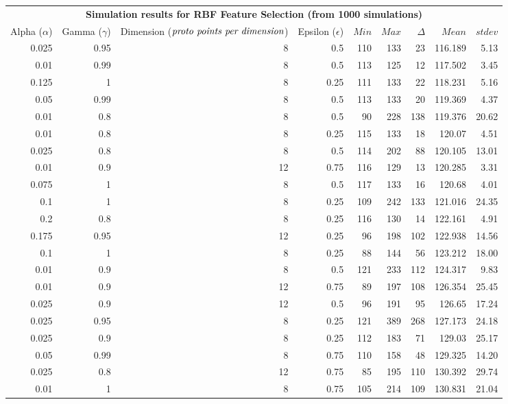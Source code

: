 \documentclass[10pt,twocolumn]{article}
\begin{document}
\begin{table}\centering
  \begin{tabular}{@{}rrrr|rrrrr@{}}\toprule
  \multicolumn{9}{c}{\textbf{Simulation results for RBF Feature Selection (from 1000 simulations)}}\\
  Alpha ($\alpha$) & Gamma ($\gamma$) & Dimension ($\emph{proto points per dimension}$) & Epsilon ($\epsilon$) & $Min$ & $Max$ & $\Delta$ & $Mean$ & $stdev$\\
  0.025 & 0.95 & 8 & 0.5 & 110 & 133 & 23 & 116.189 & 5.13\\
  0.01 & 0.99 & 8 & 0.5 & 113 & 125 & 12 & 117.502 & 3.45\\
  0.125 & 1 & 8 & 0.25 & 111 & 133 & 22 & 118.231 & 5.16\\
  0.05 & 0.99 & 8 & 0.5 & 113 & 133 & 20 & 119.369 & 4.37\\
  0.01 & 0.8 & 8 & 0.5 & 90 & 228 & 138 & 119.376 & 20.62\\
  0.01 & 0.8 & 8 & 0.25 & 115 & 133 & 18 & 120.07 & 4.51\\
  0.025 & 0.8 & 8 & 0.5 & 114 & 202 & 88 & 120.105 & 13.01\\
  0.01 & 0.9 & 12 & 0.75 & 116 & 129 & 13 & 120.285 & 3.31\\
  0.075 & 1 & 8 & 0.5 & 117 & 133 & 16 & 120.68 & 4.01\\
  0.1 & 1 & 8 & 0.25 & 109 & 242 & 133 & 121.016 & 24.35\\
  0.2 & 0.8 & 8 & 0.25 & 116 & 130 & 14 & 122.161 & 4.91\\
  0.175 & 0.95 & 12 & 0.25 & 96 & 198 & 102 & 122.938 & 14.56\\
  0.1 & 1 & 8 & 0.25 & 88 & 144 & 56 & 123.212 & 18.00\\
  0.01 & 0.9 & 8 & 0.5 & 121 & 233 & 112 & 124.317 & 9.83\\
  0.01 & 0.9 & 12 & 0.75 & 89 & 197 & 108 & 126.354 & 25.45\\
  0.025 & 0.9 & 12 & 0.5 & 96 & 191 & 95 & 126.65 & 17.24\\
  0.025 & 0.95 & 8 & 0.25 & 121 & 389 & 268 & 127.173 & 24.18\\
  0.025 & 0.9 & 8 & 0.25 & 112 & 183 & 71 & 129.03 & 25.17\\
  0.05 & 0.99 & 8 & 0.75 & 110 & 158 & 48 & 129.325 & 14.20\\
  0.025 & 0.8 & 12 & 0.75 & 85 & 195 & 110 & 130.392 & 29.74\\
  0.01 & 1 & 8 & 0.75 & 105 & 214 & 109 & 130.831 & 21.04\\

\end{tabular}
\end{table}
\end{document}
